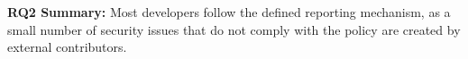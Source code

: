 

 \textbf{RQ2 Summary:} 
Most developers follow the defined reporting mechanism, as a small number of security issues that do not comply with the policy are created by external contributors.



